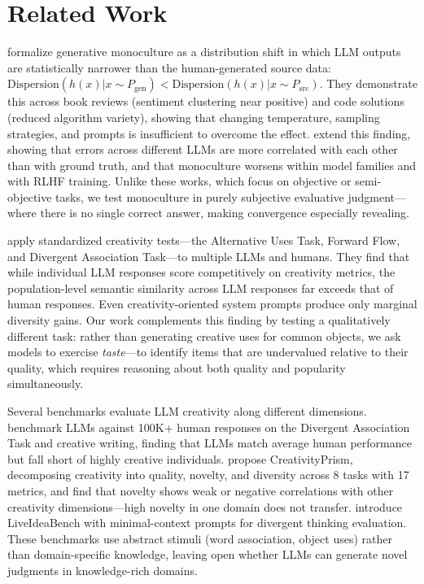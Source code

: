 \section{Related Work}
\label{sec:related}

\citet{wu2024monoculture} formalize generative monoculture as a distribution shift in which LLM outputs are statistically narrower than the human-generated source data: $\text{Dispersion}(h(x) | x \sim P_{\text{gen}}) < \text{Dispersion}(h(x) | x \sim P_{\text{src}})$. They demonstrate this across book reviews (sentiment clustering near positive) and code solutions (reduced algorithm variety), showing that changing temperature, sampling strategies, and prompts is insufficient to overcome the effect. \citet{correlated2025errors} extend this finding, showing that errors across different LLMs are more correlated with each other than with ground truth, and that monoculture worsens within model families and with RLHF training. Unlike these works, which focus on objective or semi-objective tasks, we test monoculture in purely subjective evaluative judgment---where there is no single correct answer, making convergence especially revealing.

\citet{wenger2025homogeneity} apply standardized creativity tests---the Alternative Uses Task, Forward Flow, and Divergent Association Task---to multiple LLMs and humans. They find that while individual LLM responses score competitively on creativity metrics, the population-level semantic similarity across LLM responses far exceeds that of human responses. Even creativity-oriented system prompts produce only marginal diversity gains. Our work complements this finding by testing a qualitatively different task: rather than generating creative uses for common objects, we ask models to exercise \textit{taste}---to identify items that are undervalued relative to their quality, which requires reasoning about both quality and popularity simultaneously.

Several benchmarks evaluate LLM creativity along different dimensions. \citet{divergent2024creativity} benchmark LLMs against 100K+ human responses on the Divergent Association Task and creative writing, finding that LLMs match average human performance but fall short of highly creative individuals. \citet{hou2026creativityprism} propose CreativityPrism, decomposing creativity into quality, novelty, and diversity across 8 tasks with 17 metrics, and find that novelty shows weak or negative correlations with other creativity dimensions---high novelty in one domain does not transfer. \citet{liveideabench2024} introduce LiveIdeaBench with minimal-context prompts for divergent thinking evaluation. These benchmarks use abstract stimuli (word association, object uses) rather than domain-specific knowledge, leaving open whether LLMs can generate novel judgments in knowledge-rich domains.

